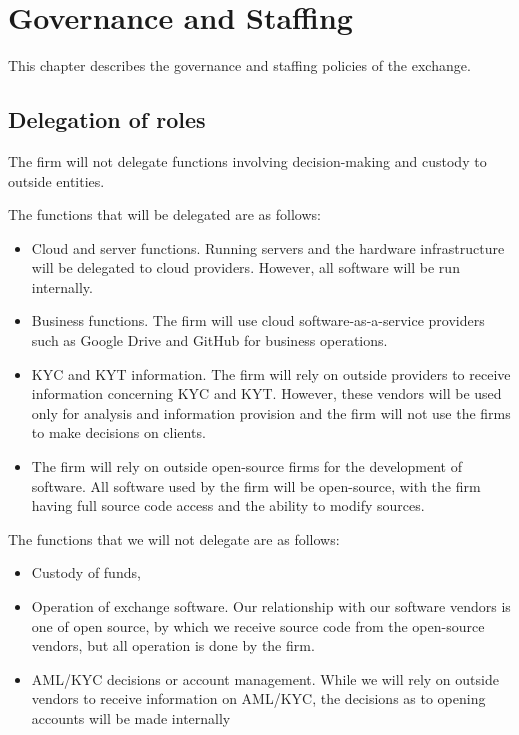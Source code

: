 \chapter{Governance and Staffing}

This chapter describes the governance and staffing policies of the
exchange.

\section{Delegation of roles}

The firm will not delegate functions involving decision-making and
custody to outside entities.

The functions that will be delegated are as follows:
\begin{itemize}
  \item Cloud and server functions.  Running servers and the hardware
    infrastructure will be delegated to cloud providers.  However, all
    software will be run internally.
 \item Business functions.  The firm will use cloud software-as-a-service providers such
   as Google Drive and GitHub for business operations.
 \item KYC and KYT information.  The firm will rely on outside
   providers to receive information concerning KYC and KYT.  However,
   these vendors will be used only for analysis and information
   provision and the firm will not use the firms to make decisions on
   clients.
\item The firm will rely on outside open-source firms for the development
  of software.  All software used by the firm will be open-source, with
  the firm having full source code access and the ability to modify sources.
\end{itemize}

The functions that we will not delegate are as follows:
\begin{itemize}
\item Custody of funds,
  \item Operation of exchange software.  Our relationship with our
    software vendors is one of open source, by which we receive source
    code from the open-source vendors, but all operation is done by
    the firm.
 \item AML/KYC decisions or account management.  While we will rely on
   outside vendors to receive information on AML/KYC, the decisions as
   to opening accounts will be made internally
\end{itemize}

